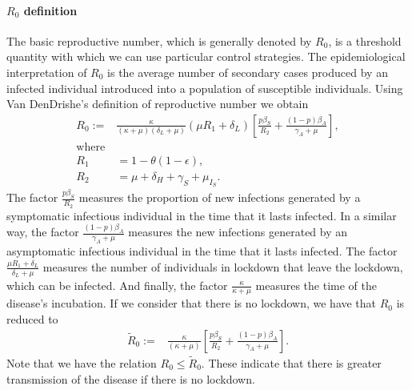 \paragraph{$R_0$ definition}
%
The basic reproductive number, which is generally denoted by $ R_0 $,
is a threshold quantity with which we can use 
particular control strategies. The epidemiological interpretation of 
$ R_0 $ is the average number of secondary cases produced by an infected
individual introduced into a population of susceptible individuals.
Using Van DenDrishe's \cite{VandenDriessche2017a} definition of reproductive number
we obtain
\begin{equation*}
    \label{eqn:reproductive_number}
    \begin{aligned}
        R_0 :=
        &
        \frac{\kappa}{(\kappa + \mu)(\delta_L + \mu)}
        \left(
            \mu R_1 + \delta_L
        \right)
        \left[
            \frac{p\beta_S}{R_2}
            +\frac{(1 - p) \beta_A}{\gamma_A+\mu}
        \right],
    \\
    \text{where} &
    \\
        R_1 &= 1 - \theta(1 - \epsilon),
    \\
        R_2 &= \mu + \delta_H + \gamma_S + \mu_{I_{S}}.
    \end{aligned}
\end{equation*}
%
The factor $\frac{p\beta_S}{R_2}$ measures the proportion of new infections
generated by a symptomatic infectious individual in the time that it lasts
infected. In a similar way, the factor $\frac{(1 - p) \beta_A}{\gamma_A+\mu}$
measures the new infections generated by an asymptomatic infectious individual
in the time that it lasts infected. The factor 
$\frac{\mu R_1 + \delta_L}{\delta_L + \mu}$ measures the number
of individuals in lockdown that leave the lockdown, which can be infected.
And finally, the factor $\frac{\kappa}{\kappa + \mu}$ measures
the time of the disease's incubation.
%
If we consider that there is no lockdown, we have that $ R_0 $ is reduced to
\begin{equation*}
    \label{eqn:reproductive_number}
    \begin{aligned}
        \tilde{R}_0 :=
        &
        \frac{\kappa}{(\kappa + \mu)}
        \left[
            \frac{p\beta_S}{R_2}
            +\frac{(1 - p) \beta_A}{\gamma_A+\mu}
        \right].
    \end{aligned}
\end{equation*}
%
Note that we have the relation $ R_0 \leq \tilde{R}_0 $. These indicate that there is greater transmission of the disease if there is no lockdown.

